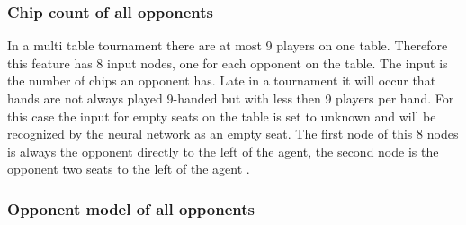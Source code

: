 \subsubsection{Chip count of all opponents}
In a  multi table tournament there are at most 9 players on one table. Therefore this feature has 8 input nodes, one for each opponent on the table. The input is the number of chips an opponent has. Late in a tournament it will occur that hands are not always played 9-handed but with less then 9 players per hand. For this case the input for empty seats on the table is set to unknown and will be recognized by the neural network as an empty seat. The first node of this 8 nodes is always the opponent directly to the left of the agent, the second node is the opponent two seats to the left of the agent \cite{evolutionary_methods}. 
\subsubsection{Opponent model of all opponents}
